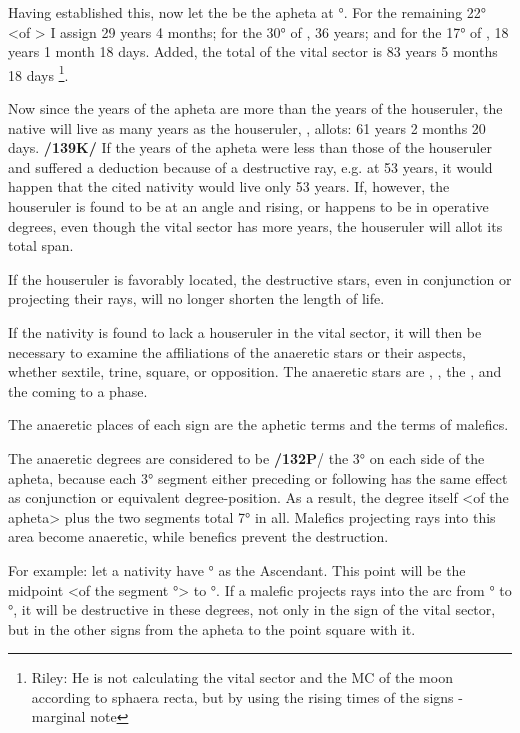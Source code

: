 Having established this, now let the \Moon\xspace be the apheta at \Libra\xspace 8°. For the remaining 22° <of \Libra> I assign 29 years 4 months; for the 30° of \Scorpio, 36 years; and for the 17° of \Sagittarius, 18 years 1 month 18 days. Added, the total of the vital sector is 83 years 5 months 18 days
\footnote{Riley: He is not calculating the vital sector and the MC of the moon according to sphaera recta, but by using
the rising times of the signs - marginal note}.

Now since the years of the apheta are more than the years of the houseruler, the native will live as many years as the
houseruler, \Mercury, allots: 61 years 2 months 20 days. \textbf{/139K/} If the years of the apheta were less than
those of the houseruler and suffered a deduction because of a destructive ray, e.g. at 53 years, it would happen that the cited nativity would live only 53 years. If, however, the houseruler is found to be at an angle and rising, or happens to be in operative degrees, even though the vital sector has more years, the houseruler will allot its total span. 

If the houseruler is favorably located, the destructive stars, even in conjunction or projecting their rays, will no longer shorten the length of life. 

If the nativity is found to lack a houseruler in the vital sector, it will then be necessary to examine the affiliations of the anaeretic stars or their aspects, whether sextile, trine, square, or opposition. The anaeretic stars are \Saturn, \Mars, the \Sun, and the \Moon\xspace coming to a phase. 

The anaeretic places of each sign are the aphetic terms and the terms of malefics. 

The anaeretic degrees are considered to be \textbf{/132P}/ the 3° on each side of the apheta, because each 3° segment either preceding or following has the same effect as conjunction or equivalent degree-position. As a result, the degree itself <of the apheta> plus the two segments total 7° in all. Malefics projecting rays into this area become anaeretic, while benefics prevent the destruction.

For example: let a nativity have \Aries\xspace 12° as the Ascendant. This point will be the midpoint <of the segment \Aries\xspace 9°> to \Aries\xspace 15°. If a malefic projects rays into the arc from \Aries\xspace 9° to \Aries\xspace 15°, it will be destructive in these degrees, not only in the sign of the vital sector, but in the other signs from the apheta
to the point square with it. 

